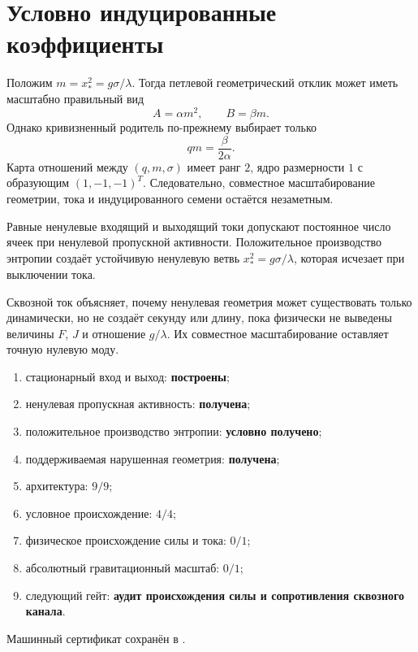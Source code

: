 \section{Условно индуцированные коэффициенты}

Положим $m=x_*^2=g\sigma/\lambda$. Тогда петлевой геометрический отклик
может иметь масштабно правильный вид
\begin{equation}
 A=\alpha m^2,
 \qquad B=\beta m.
 \label{eq:v10-throughflow-induced-coefficients}
\end{equation}
Однако кривизненный родитель по-прежнему выбирает только
\begin{equation}
 qm=\frac{\beta}{2\alpha}.
 \label{eq:v10-throughflow-curvature-invariant}
\end{equation}
Карта отношений между $(q,m,\sigma)$ имеет ранг $2$, ядро размерности $1$
с образующим $(1,-1,-1)^T$. Следовательно, совместное масштабирование
геометрии, тока и индуцированного семени остаётся незаметным.

\begin{theorem}
Равные ненулевые входящий и выходящий токи допускают постоянное число ячеек
при ненулевой пропускной активности. Положительное производство энтропии
создаёт устойчивую ненулевую ветвь $x_*^2=g\sigma/\lambda$, которая исчезает
при выключении тока.
\end{theorem}

\begin{nogocriterion}
Сквозной ток объясняет, почему ненулевая геометрия может существовать только
динамически, но не создаёт секунду или длину, пока физически не выведены
величины $F$, $J$ и отношение $g/\lambda$. Их совместное масштабирование
оставляет точную нулевую моду.
\end{nogocriterion}

\begin{protocol}\begin{enumerate}
\item стационарный вход и выход: \textbf{построены};
\item ненулевая пропускная активность: \textbf{получена};
\item положительное производство энтропии: \textbf{условно получено};
\item поддерживаемая нарушенная геометрия: \textbf{получена};
\item архитектура: \textbf{$9/9$};
\item условное происхождение: \textbf{$4/4$};
\item физическое происхождение силы и тока: \textbf{$0/1$};
\item абсолютный гравитационный масштаб: \textbf{$0/1$};
\item следующий гейт: \textbf{аудит происхождения силы и сопротивления сквозного канала}.
\end{enumerate}\end{protocol}

Машинный сертификат сохранён в
.